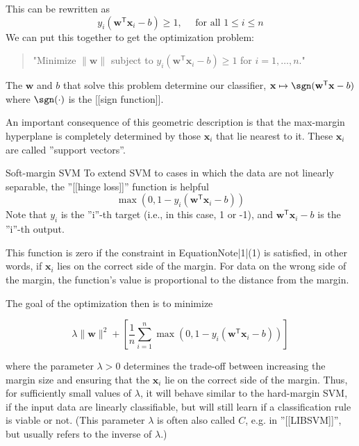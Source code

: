 \documentclass[aspectratio=169]{beamer}
\begin{document}
\begin{frame}
    This can be rewritten as
    \[
        y_i(\mathbf{w}^\mathsf{T} \mathbf{x}_i - b) \ge 1, \quad \text{ for all } 1 \le i \le n
    \]
    We can put this together to get the optimization problem:
    \begin{quote}
        "Minimize $\|\mathbf{w}\|$ subject to $y_i(\mathbf{w}^\mathsf{T} \mathbf{x}_i - b) \ge 1$ for $i = 1, \ldots, n$."
    \end{quote}
    
    The $\mathbf{w}$ and $b$ that solve this problem determine our classifier, $\mathbf{x} \mapsto \sgn(\mathbf{w}^\mathsf{T} \mathbf{x} - b)$ where $\sgn(\cdot)$ is the [[sign function]].
\end{frame}

\begin{frame}   
    An important consequence of this geometric description is that the max-margin hyperplane is completely determined by those $\mathbf{x}_i$ that lie nearest to it. These $\mathbf{x}_i$ are called ''support vectors''.
\end{frame}

\begin{frame}{Soft-margin SVM}
    To extend SVM to cases in which the data are not linearly separable, the ''[[hinge loss]]'' function is helpful
    \[
        \max\left(0, 1 - y_i(\mathbf{w}^\mathsf{T} \mathbf{x}_i - b)\right)
    \]
    Note that $y_i$ is the ''i''-th target (i.e., in this case, 1 or -1), and $\mathbf{w}^\mathsf{T} \mathbf{x}_i - b$ is the ''i''-th output.
    
    This function is zero if the constraint in {{EquationNote|1|(1)}} is satisfied, in other words, if $\mathbf{x}_i$ lies on the correct side of the margin. For data on the wrong side of the margin, the function's value is proportional to the distance from the margin.
\end{frame}

\begin{frame}
   
    The goal of the optimization then is to minimize
    
    \[ 
        \lambda \lVert \mathbf{w} \rVert^2 +\left[\frac 1 n \sum_{i=1}^n \max\left(0, 1 - y_i(\mathbf{w}^\mathsf{T} \mathbf{x}_i - b)\right) \right]
    \]
    
    where the parameter $\lambda > 0$ determines the trade-off between increasing the margin size and ensuring that the $\mathbf{x}_i$ lie on the correct side of the margin. Thus, for sufficiently small values of $\lambda$, it will behave similar to the hard-margin SVM, if the input data are linearly classifiable, but will still learn if a classification rule is viable or not. (This parameter $\lambda$ is often also called $C$, e.g. in ''[[LIBSVM]]'', but usually refers to the inverse of $\lambda$.)
        
\end{frame}
\end{document}
